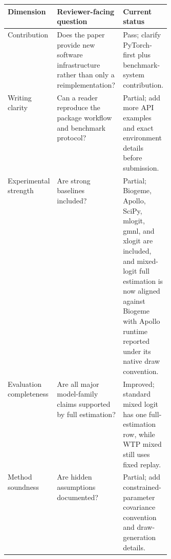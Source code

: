 \small
\begin{tabularx}{\linewidth}{>{\raggedright\arraybackslash}p{0.22\linewidth}X>{\raggedright\arraybackslash}p{0.15\linewidth}}
\toprule
Dimension & Reviewer-facing question & Current status \\
\midrule
Contribution & Does the paper provide new software infrastructure rather than only a reimplementation? & Pass; clarify PyTorch-first plus benchmark-system contribution. \\
Writing clarity & Can a reader reproduce the package workflow and benchmark protocol? & Partial; add more API examples and exact environment details before submission. \\
Experimental strength & Are strong baselines included? & Partial; Biogeme, Apollo, SciPy, mlogit, gmnl, and xlogit are included, and mixed-logit full estimation is now aligned against Biogeme with Apollo runtime reported under its native draw convention. \\
Evaluation completeness & Are all major model-family claims supported by full estimation? & Improved; standard mixed logit has one full-estimation row, while WTP mixed still uses fixed replay. \\
Method soundness & Are hidden assumptions documented? & Partial; add constrained-parameter covariance convention and draw-generation details. \\
\bottomrule
\end{tabularx}
